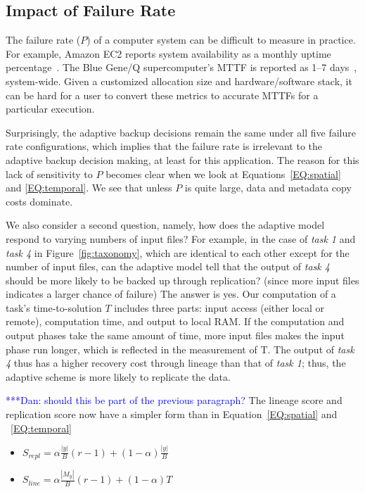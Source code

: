 \documentclass{sig-alternate}
\newcommand{\iannote}[1]{ {\textcolor{red}    { ***Ian:      #1 }}}
\newcommand{\katznote}[1]{ {\textcolor{blue}    { ***Dan:      #1 }}}
\newcommand{\zhaonote}[1]{{\textcolor{cyan}    { ***Zhao:      #1 }}}
\newcommand{\iannote}[1]{}
\newcommand{\katznote}[1]{}
\newcommand{\zhaonote}[1]{}
\begin{document}
\subsection{Impact of Failure Rate}
\label{sec:Perf:Failure}
The failure rate ($P$) of a computer system can be difficult to measure in practice.
For example, Amazon EC2 reports  system availability as a monthly uptime percentage~\cite{AWS-SLA}.
The Blue Gene/Q supercomputer's MTTF is reported as 1--7 days~\cite{Snir-resilience}, system-wide.
Given a customized allocation size
and hardware/software stack, it can be hard for a user to convert these metrics to accurate MTTFs for a particular execution.

Surprisingly, the adaptive backup decisions remain the same under all five failure rate configurations, which implies that the failure rate is irrelevant to the adaptive backup decision making, at least for this application.
The reason for this lack of sensitivity to $P$ becomes clear when we look at Equations~\ref{EQ:spatial} and \ref{EQ:temporal}.
We see that unless $P$ is quite large, data and metadata copy costs dominate.


We also consider a second question, namely, how does the adaptive model respond to varying numbers of input files?
For example, in the case of {\em task 1} and {\em task 4} in Figure~\ref{fig:taxonomy}, which are identical to each other except for the number of input files, can the adaptive model tell that the output of {\em task 4} should be more likely to be backed up through replication? (since more input files indicates a larger chance of failure)
The answer is yes.
Our computation of a task's time-to-solution $T$ includes three parts: input access (either local or remote), computation time, and output to local RAM. If the computation and output phases take the same amount of time, more input files makes the input phase run longer, which is reflected in the measurement of T. The output of {\em task 4} thus has a higher recovery cost through lineage than that of {\em task 1}; thus, the adaptive scheme is more likely to replicate the data.

\katznote{should this be part of the previous paragraph?}
The lineage score and replication score now have a simpler form than in Equation~\ref{EQ:spatial} and ~\ref{EQ:temporal}
\begin{itemize}
  \item[] $S_{repl} = \alpha\frac{|y|}{B}(r-1) + (1-\alpha)\frac{|y|}{B} $
  \item[] $S_{line} = \alpha\frac{|M_y|}{B}(r-1) + (1-\alpha)T$
\end{itemize}
\end{document}

